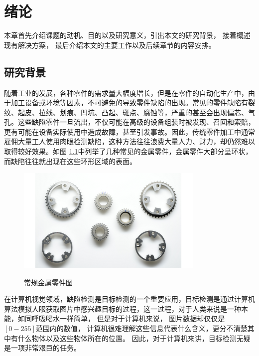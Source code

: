 \chapter{绪论}\label{chapter_introduction}

本章首先介绍课题的动机、目的以及研究意义，引出本文的研究背景，
接着概述现有解决方案，
最后介绍本文的主要工作以及后续章节的内容安排。

\section{研究背景}

随着工业的发展，各种零件的需求量大幅度增长，但是在零件的自动化生产中，由于加工设备或环境等因素，不可避免的导致零件缺陷的出现。常见的零件缺陷有裂纹、起皮、拉线、划痕、凹坑、凸起、斑点、腐蚀等，严重的甚至会出现偏芯、气孔。这些缺陷零件一旦流出，不仅可能在高级的设备组装时被发现、召回和索赔，更有可能在设备实际使用中造成故障，甚至引发事故。因此，传统零件加工中通常雇佣大量工人使用肉眼检测缺陷，这种方法往往浪费大量人力、财力，却仍然难以取得较好效果。如图
\ref{fig:changguilingjian}中列举了几种常见的金属零件，金属零件大部分呈环状，而缺陷往往就出现在这些环形区域的表面。
\begin{figure}[htbp]
\centering
\includegraphics[width=0.8\textwidth]{figures/changguilingjian.png}\\
\caption{常规金属零件图}\label{fig:changguilingjian}
\end{figure}

在计算机视觉领域，缺陷检测是目标检测的一个重要应用，目标检测是通过计算机算法模拟人眼获取图片中感兴趣目标的过程，这一过程，对于人类来说是一种本能，如同呼吸喝水一样简单，
但是对于计算机来说，
图片数据却仅仅是$[0-255]$范围内的数值，
计算机很难理解这些信息代表什么含义，更分不清楚其中有什么物体以及这些物体所在的位置。
因此，对于计算机来讲，目标检测无疑是一项非常艰巨的任务。

